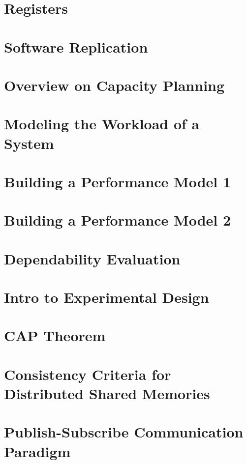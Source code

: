 \documentclass{article}
\begin{document}
\newpage
\section{Registers}

\newpage
\section{Software Replication}

\newpage
\section{Overview on Capacity Planning}

\newpage
\section{Modeling the Workload of a System}

\newpage
\section{Building a Performance Model 1}

\newpage
\section{Building a Performance Model 2}

\newpage
\section{Dependability Evaluation}

\newpage
\section{Intro to Experimental Design}

\newpage
\section{CAP Theorem}

\newpage
\section{Consistency Criteria for Distributed Shared Memories}

\newpage
\section{Publish-Subscribe Communication Paradigm}
\end{document}
